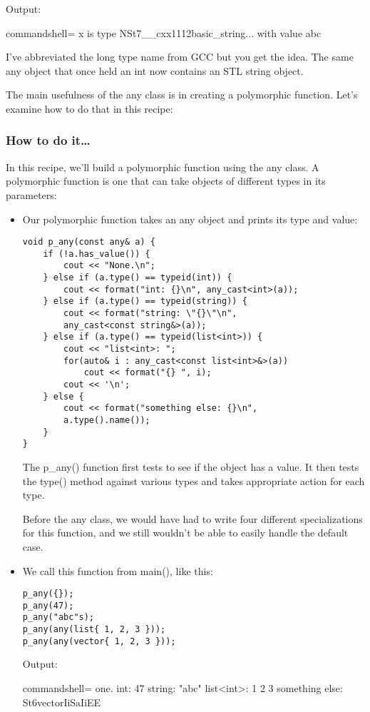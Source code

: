 Output:

\begin{tcblisting}{commandshell={}}
x is type NSt7__cxx1112basic_string... with value abc
\end{tcblisting}

I've abbreviated the long type name from GCC but you get the idea. The same any object that once held an int now contains an STL string object.

The main usefulness of the any class is in creating a polymorphic function. Let's examine how to do that in this recipe:

\subsubsection{How to do it…}

In this recipe, we'll build a polymorphic function using the any class. A polymorphic function is one that can take objects of different types in its parameters:

\begin{itemize}
\item 
Our polymorphic function takes an any object and prints its type and value:

\begin{lstlisting}[style=styleCXX]
void p_any(const any& a) {
	if (!a.has_value()) {
		cout << "None.\n";
	} else if (a.type() == typeid(int)) {
		cout << format("int: {}\n", any_cast<int>(a));
	} else if (a.type() == typeid(string)) {
		cout << format("string: \"{}\"\n",
		any_cast<const string&>(a));
	} else if (a.type() == typeid(list<int>)) {
		cout << "list<int>: ";
		for(auto& i : any_cast<const list<int>&>(a))
			cout << format("{} ", i);
		cout << '\n';
	} else {
		cout << format("something else: {}\n",
		a.type().name());
	}
}
\end{lstlisting}

The p\_any() function first tests to see if the object has a value. It then tests the type() method against various types and takes appropriate action for each type.

Before the any class, we would have had to write four different specializations for this function, and we still wouldn't be able to easily handle the default case.

\item 
We call this function from main(), like this:

\begin{lstlisting}[style=styleCXX]
p_any({});
p_any(47);
p_any("abc"s);
p_any(any(list{ 1, 2, 3 }));
p_any(any(vector{ 1, 2, 3 }));
\end{lstlisting}

Output:

\begin{tcblisting}{commandshell={}}
one.
int: 47
string: "abc"
list<int>: 1 2 3
something else: St6vectorIiSaIiEE
\end{tcblisting}

\end{itemize}

